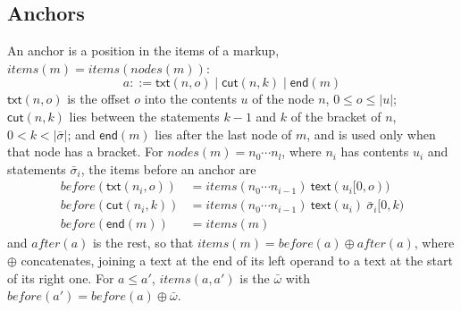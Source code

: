 \documentclass[11pt]{article}
\numberwithin{equation}{section}
\newcommand{\kw}[1]{\ensuremath{\mathsf{#1}}}
\begin{document}
\subsection{Anchors}

An anchor is a position in the items of a markup, $\mathit{items}(m) =
\mathit{items}(\mathit{nodes}(m))$:
\begin{equation}\label{eq:anchors}
a ::= \kw{txt}(n, o) \mid \kw{cut}(n, k) \mid \kw{end}(m)
\end{equation}
$\kw{txt}(n, o)$ is the offset $o$ into the contents $u$ of the node $n$,
$0 \le o \le |u|$; $\kw{cut}(n, k)$ lies between the statements $k-1$ and
$k$ of the bracket of $n$, $0 < k < |\bar\sigma|$; and $\kw{end}(m)$ lies
after the last node of $m$, and is used only when that node has a bracket.
For $\mathit{nodes}(m) = n_0 \cdots n_{l}$, where $n_i$ has contents $u_i$
and statements $\bar\sigma_i$, the items before an anchor are
\begin{equation}\label{eq:anchor-items}
\begin{aligned}
\mathit{before}(\kw{txt}(n_i, o)) &= \mathit{items}(n_0 \cdots n_{i-1})\
  \kw{text}(u_i[0, o)) \\
\mathit{before}(\kw{cut}(n_i, k)) &= \mathit{items}(n_0 \cdots n_{i-1})\
  \kw{text}(u_i)\ \bar\sigma_i[0, k) \\
\mathit{before}(\kw{end}(m)) &= \mathit{items}(m)
\end{aligned}
\end{equation}
and $\mathit{after}(a)$ is the rest, so that $\mathit{items}(m) =
\mathit{before}(a) \oplus \mathit{after}(a)$, where $\oplus$ concatenates,
joining a text at the end of its left operand to a text at the start of its
right one.  For $a \le a'$, $\mathit{items}(a, a')$ is the $\bar\omega$
with $\mathit{before}(a') = \mathit{before}(a) \oplus \bar\omega$.
\end{document}
